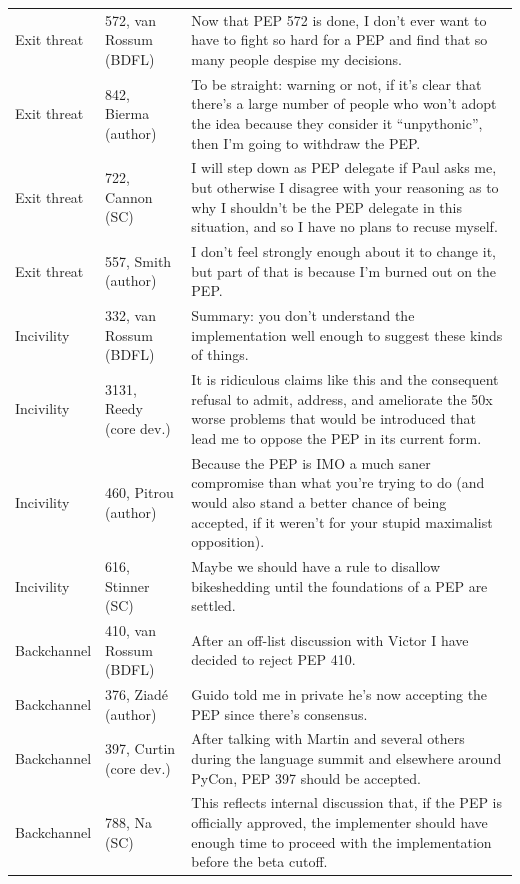 \begin{table}[t]
\begin{tabular}{p{}p{}p{}}
Exit threat & 572, van Rossum (BDFL) & Now that PEP 572 is done, I don't ever want to have to fight so hard for a PEP and find that so many people despise my decisions. \\
Exit threat & 842, Bierma (author) & To be straight: warning or not, if it's clear that there's a large number of people who won't adopt the idea because they consider it ``unpythonic'', then I'm going to withdraw the PEP. \\
Exit threat & 722, Cannon (SC) & I will step down as PEP delegate if Paul asks me, but otherwise I disagree with your reasoning as to why I shouldn't be the PEP delegate in this situation, and so I have no plans to recuse myself. \\
Exit threat & 557, Smith (author) & I don't feel strongly enough about it to change it, but part of that is because I'm burned out on the PEP. \\
Incivility & 332, van Rossum (BDFL) & Summary: you don't understand the implementation well enough to suggest these kinds of things. \\
Incivility & 3131, Reedy (core dev.) & It is ridiculous claims like this and the consequent refusal to admit, address, and ameliorate the 50x worse problems that would be introduced that lead me to oppose the PEP in its current form. \\
Incivility & 460, Pitrou (author) & Because the PEP is IMO a much saner compromise than what you're trying to do (and would also stand a better chance of being accepted, if it weren't for your stupid maximalist opposition). \\
Incivility & 616, Stinner (SC) & Maybe we should have a rule to disallow bikeshedding until the foundations of a PEP are settled. \\
Backchannel & 410, van Rossum (BDFL) & After an off-list discussion with Victor I have decided to reject PEP 410. \\
Backchannel & 376, Ziad\'e (author) & Guido told me in private he's now accepting the PEP since there's consensus. \\
Backchannel & 397, Curtin (core dev.) & After talking with Martin and several others during the language summit and elsewhere around PyCon, PEP 397 should be accepted. \\
Backchannel & 788, Na (SC) & This reflects internal discussion that, if the PEP is officially approved, the implementer should have enough time to proceed with the implementation before the beta cutoff. \\

\end{tabular}
\end{table}
